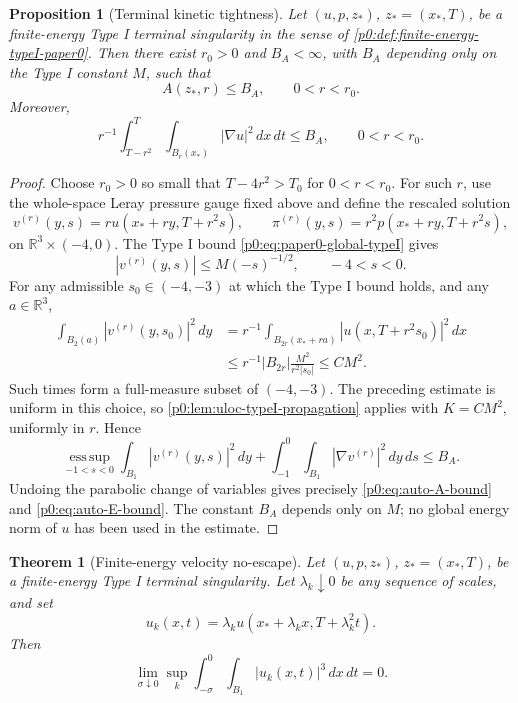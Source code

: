 \documentclass[11pt]{amsart}
\theoremstyle{plain}
\newtheorem{theorem}{Theorem}[section]
\newtheorem{proposition}[proposition]{Proposition}
\theoremstyle{definition}
\theoremstyle{remark}
\numberwithin{equation}{section}
\begin{document}
\begin{proposition}[Terminal kinetic tightness]
\label{p0:prop:auto-terminal-A}
Let \((u,p,z_*)\), \(z_*=(x_*,T)\), be a finite-energy Type I terminal
singularity in the sense of \cref{p0:def:finite-energy-typeI-paper0}.  Then there
exist \(r_0>0\) and \(B_A<\infty\), with \(B_A\) depending only on the Type I
constant \(M\), such that
\begin{equation}\label{p0:eq:auto-A-bound}
  A(z_*,r)\le B_A,
  \qquad 0<r<r_0 .
\end{equation}
Moreover,
\begin{equation}\label{p0:eq:auto-E-bound}
  r^{-1}\int_{T-r^2}^{T}\int_{B_r(x_*)}|\nabla u|^2\,dx\,dt
  \le B_A,
  \qquad 0<r<r_0 .
\end{equation}
\end{proposition}

\begin{proof}
Choose \(r_0>0\) so small that \(T-4r^2>T_0\) for \(0<r<r_0\).  For such
\(r\), use the whole-space Leray pressure gauge fixed above and define the
rescaled solution
\[
  v^{(r)}(y,s)=r u(x_*+ry,T+r^2s),
  \qquad
  \pi^{(r)}(y,s)=r^2 p(x_*+ry,T+r^2s),
\]
on \(\mathbb R^3\times(-4,0)\).  The Type I bound
\eqref{p0:eq:paper0-global-typeI} gives
\[
  |v^{(r)}(y,s)|\le M(-s)^{-1/2},
  \qquad -4<s<0 .
\]
For any admissible \(s_0\in(-4,-3)\) at which the Type I bound holds, and any
\(a\in\mathbb R^3\),
\begin{align*}
  \int_{B_2(a)} |v^{(r)}(y,s_0)|^2\,dy
  &= r^{-1}\int_{B_{2r}(x_*+ra)}
       |u(x,T+r^2s_0)|^2\,dx                                    \\
  &\le r^{-1}|B_{2r}|\frac{M^2}{r^2|s_0|}
   \le C M^2 .
\end{align*}
Such times form a full-measure subset of \((-4,-3)\).  The preceding estimate
is uniform in this choice, so \cref{p0:lem:uloc-typeI-propagation} applies with
\(K=CM^2\), uniformly in \(r\).  Hence
\[
  \operatorname*{ess\,sup}_{-1<s<0}\int_{B_1}|v^{(r)}(y,s)|^2\,dy
  +\int_{-1}^{0}\int_{B_1}|\nabla v^{(r)}|^2\,dy\,ds
  \le B_A .
\]
Undoing the parabolic change of variables gives precisely
\eqref{p0:eq:auto-A-bound} and \eqref{p0:eq:auto-E-bound}.  The constant \(B_A\)
depends only on \(M\); no global energy norm of \(u\) has been used in the
estimate.
\end{proof}

\begin{theorem}[Finite-energy velocity no-escape]
\label{p0:thm:auto-velocity-no-escape}
Let \((u,p,z_*)\), \(z_*=(x_*,T)\), be a finite-energy Type I terminal
singularity.  Let \(\lambda_k\downarrow0\) be any sequence of scales, and set
\[
  u_k(x,t)=\lambda_k u(x_*+\lambda_k x,T+\lambda_k^2 t).
\]
Then
\begin{equation}\label{p0:eq:auto-no-escape}
  \lim_{\sigma\downarrow0}
  \sup_k\int_{-\sigma}^{0}\int_{B_1}|u_k(x,t)|^3\,dx\,dt=0 .
\end{equation}
\end{theorem}
\end{document}
